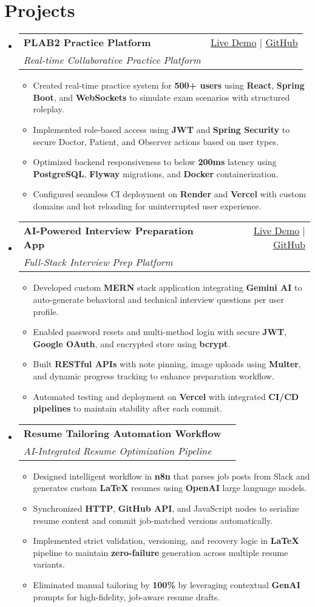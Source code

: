 \documentclass[letterpaper,11pt]{article}
\makeatletter
\newcommand{\resumeItem}[1]{\item\small{#1 \vspace{-2pt}}}
\newcommand{\resumeSubheading}[4]{
  \vspace{-1pt}\item
    \begin{tabular*}{0.97\textwidth}[t]{l@{\extracolsep{\fill}}r}
      \textbf{#1} & #2 \\
      \textit{\small#3} & \textit{\small #4} \\
    \end{tabular*}\vspace{-5pt}
}
\newcommand{\resumeSubHeadingListStart}{\begin{itemize}[leftmargin=*]}
\newcommand{\resumeSubHeadingListEnd}{\end{itemize}}
\newcommand{\resumeItemListStart}{\begin{itemize}}
\newcommand{\resumeItemListEnd}{\end{itemize}\vspace{-5pt}}
\makeatother
\begin{document}
\section{Projects}
  \resumeSubHeadingListStart
    \resumeSubheading
      {\textbf{PLAB2 Practice Platform}}{\href{https://plab2practice.com}{Live Demo} | \href{https://github.com/altansaid/plab2projectnew}{GitHub}}
      {Real-time Collaborative Practice Platform}{}
      \resumeItemListStart
        \resumeItem{Created real-time practice system for \textbf{500+ users} using \textbf{React}, \textbf{Spring Boot}, and \textbf{WebSockets} to simulate exam scenarios with structured roleplay.}
        \resumeItem{Implemented role-based access using \textbf{JWT} and \textbf{Spring Security} to secure Doctor, Patient, and Observer actions based on user types.}
        \resumeItem{Optimized backend responsiveness to below \textbf{200ms} latency using \textbf{PostgreSQL}, \textbf{Flyway} migrations, and \textbf{Docker} containerization.}
        \resumeItem{Configured seamless CI deployment on \textbf{Render} and \textbf{Vercel} with custom domains and hot reloading for uninterrupted user experience.}
      \resumeItemListEnd

    \resumeSubheading
      {\textbf{AI-Powered Interview Preparation App}}{\href{https://interviewcoach-ai.vercel.app}{Live Demo} | \href{https://github.com/altansaid/interviewcoach-ai}{GitHub}}
      {Full-Stack Interview Prep Platform}{}
      \resumeItemListStart
        \resumeItem{Developed custom \textbf{MERN} stack application integrating \textbf{Gemini AI} to auto-generate behavioral and technical interview questions per user profile.}
        \resumeItem{Enabled password resets and multi-method login with secure \textbf{JWT}, \textbf{Google OAuth}, and encrypted store using \textbf{bcrypt}.}
        \resumeItem{Built \textbf{RESTful APIs} with note pinning, image uploads using \textbf{Multer}, and dynamic progress tracking to enhance preparation workflow.}
        \resumeItem{Automated testing and deployment on \textbf{Vercel} with integrated \textbf{CI/CD pipelines} to maintain stability after each commit.}
      \resumeItemListEnd

    \resumeSubheading
      {\textbf{Resume Tailoring Automation Workflow}}{} {AI-Integrated Resume Optimization Pipeline}{}
      \resumeItemListStart
        \resumeItem{Designed intelligent workflow in \textbf{n8n} that parses job posts from Slack and generates custom \textbf{LaTeX} resumes using \textbf{OpenAI} large language models.}
        \resumeItem{Synchronized \textbf{HTTP}, \textbf{GitHub API}, and JavaScript nodes to serialize resume content and commit job-matched versions automatically.}
        \resumeItem{Implemented strict validation, versioning, and recovery logic in \textbf{LaTeX} pipeline to maintain \textbf{zero-failure} generation across multiple resume variants.}
        \resumeItem{Eliminated manual tailoring by \textbf{100\%} by leveraging contextual \textbf{GenAI} prompts for high-fidelity, job-aware resume drafts.}
      \resumeItemListEnd
  \resumeSubHeadingListEnd
\end{document}
